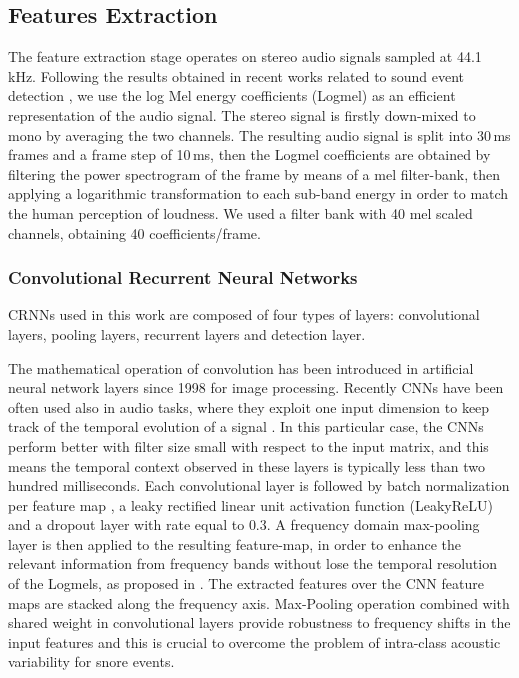 \subsection{Features Extraction}
\label{ssec:feat}
The feature extraction stage operates on stereo audio signals sampled at 44.1 kHz. 
Following the results obtained in recent works related to sound event detection \cite{DCASE2017Workshop}, we use the log Mel energy coefficients (Logmel) as an efficient representation of the audio signal. The stereo signal is firstly down-mixed to mono by averaging the two channels. 
The resulting audio signal is split into 30\,ms frames and a frame step of 10\,ms, then the Logmel coefficients are obtained by filtering the power spectrogram of the frame by means of a mel filter-bank, then applying a logarithmic  transformation to each sub-band energy in order to match the human perception of loudness. We used a filter bank with 40 mel scaled channels, obtaining 40 coefficients/frame. 

\subsubsection{Convolutional Recurrent Neural Networks}
\label{ssec:CNN}

CRNNs used in this work are composed of four types of layers: convolutional layers, pooling layers, recurrent layers and detection layer. 

The mathematical operation of convolution has been introduced in artificial neural network layers since 1998 \cite{lecun1998gradient} for image processing. 
Recently CNNs have been often used also in audio tasks, where they exploit one input dimension to keep track of the temporal evolution of a signal \cite{vesperini2018localizing}. In this particular case, the CNNs perform better with filter size small with respect to the input matrix, and this means the temporal context observed in these layers is typically less than two hundred milliseconds.
Each convolutional layer is followed by batch normalization per feature map \cite{ioffe2015batch}, a leaky rectified linear unit activation function (LeakyReLU) and a dropout layer \cite{srivastava2014dropout} with rate equal to $0.3$.
A frequency domain max-pooling layer is then applied to the resulting feature-map, in order to enhance the relevant information from frequency bands without lose the temporal resolution of the Logmels, as proposed in \cite{cakirconvolutional}.
The extracted features over the CNN feature maps are stacked along the frequency axis.
Max-Pooling operation combined with shared weight in convolutional layers provide robustness to frequency shifts in the input features and this is crucial to overcome the problem of intra-class acoustic variability for snore events.

